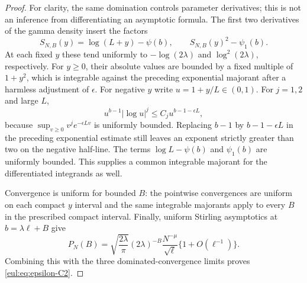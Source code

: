 \documentclass[11pt]{article}
\numberwithin{equation}{section}
\theoremstyle{definition}
\theoremstyle{remark}
\begin{document}
\begin{proof}
For clarity, the same domination controls parameter derivatives;
this is not an inference from differentiating an asymptotic formula.
The first two derivatives of the gamma density insert the factors
\[
 S_{N,B}(y)=\log(L+y)-\psi(b),\qquad
 S_{N,B}(y)^2-\psi_1(b).
\]
At each fixed $y$ these tend uniformly to $-\log(2\lambda)$ and
$\log^2(2\lambda)$, respectively.
For $y\geq0$, their absolute values are bounded by a fixed multiple
of $1+y^2$, which is integrable against the preceding exponential
majorant after a harmless adjustment of $\epsilon$.
For negative $y$ write $u=1+y/L\in(0,1)$.
For $j=1,2$ and large $L$,
\[
 u^{b-1}|\log u|^j\leq C_j u^{b-1-\epsilon L},
\]
because $\sup_{v\geq0}v^j e^{-\epsilon L v}$ is uniformly bounded.
Replacing $b-1$ by $b-1-\epsilon L$ in the preceding exponential
estimate still leaves an exponent strictly greater than two on the
negative half-line.  The terms $\log L-\psi(b)$ and $\psi_1(b)$
are uniformly bounded.  This supplies a common integrable majorant
for the differentiated integrands as well.

Convergence is uniform for bounded $B$: the pointwise convergences
are uniform on each compact $y$ interval and the same integrable
majorants apply to every $B$ in the prescribed compact interval.
Finally, uniform Stirling asymptotics \cite{DLMFGamma} at $b=\lambda\ell+B$ give
\begin{equation}\label{eul:eq:gamma-window-density}
 P_N(B)=\sqrt{\frac{2\lambda}{\pi}}(2\lambda)^{-B}
           \frac{N^{-\mu}}{\sqrt\ell}\{1+O(\ell^{-1})\}.
\end{equation}
Combining this with the three dominated-convergence limits proves
\eqref{eul:eq:epsilon-C2}.
\end{proof}
\end{document}
